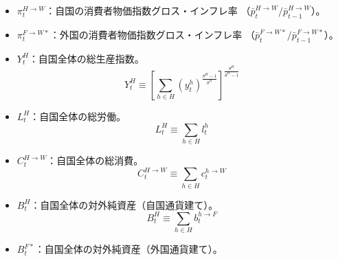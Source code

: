 \begin{itemize}
    \item
    \label{itm:chapter3_definitions_variables_endogenous_aggregate_pi_H_W}
        \(\pi_t^{H\to W}\)：自国の消費者物価指数グロス・インフレ率
        （\(\bar{p}_t^{H\to W}/\bar{p}_{t-1}^{H\to W}\)）。
    \item
    \label{itm:chapter3_definitions_variables_endogenous_aggregate_pi_F_W_star}
        \(\pi_t^{F\to W*}\)：外国の消費者物価指数グロス・インフレ率
        （\(\bar{p}_t^{F\to W*}/\bar{p}_{t-1}^{F\to W*}\)）。
    \item
    \label{itm:chapter3_definitions_variables_endogenous_aggregate_Y_H}
        \(Y_t^H\)：自国全体の総生産指数。
        \begin{equation}
        \label{form:chapter3_definitions_variables_endogenous_aggregate_Y_H_def}
            Y_t^H\equiv\left[\sum_{h\in H}(y_t^h)^{\frac{\theta^H-1}{\theta^H}}\right]^{\frac{\theta^H}{\theta^H-1}}
        \end{equation}
    \item
    \label{itm:chapter3_definitions_variables_endogenous_aggregate_L_H}
        \(L_t^H\)：自国全体の総労働。
        \begin{equation}
        \label{form:chapter3_definitions_variables_endogenous_aggregate_L_H_def}
            L_t^H\equiv\sum_{h\in H}l_t^h
        \end{equation}
    \item
    \label{itm:chapter3_definitions_variables_endogenous_aggregate_C_H_W}
        \(C_t^{H\to W}\)：自国全体の総消費。
        \begin{equation}
        \label{form:chapter3_definitions_variables_endogenous_aggregate_C_H_W_def}
            C_t^{H\to W}\equiv\sum_{h\in H}c_t^{h\to W}
        \end{equation}
    \item
    \label{itm:chapter3_definitions_variables_endogenous_aggregate_B_H}
        \(B_t^H\)：自国全体の対外純資産（自国通貨建て）。
        \begin{equation}
        \label{form:chapter3_definitions_variables_endogenous_aggregate_B_H_def}
            B_t^H\equiv\sum_{h\in H}b_t^{h\to F}
        \end{equation}
    \item
    \label{itm:chapter3_definitions_variables_endogenous_aggregate_B_F_star}
        \(B_t^{F*}\)：自国全体の対外純資産（外国通貨建て）。
        \begin{equation}
        \label{form:chapter3_definitions_variables_endogenous_aggregate_B_F_star_def}

\end{equation}
\end{itemize}
